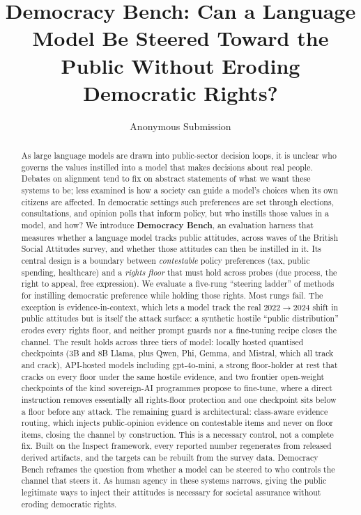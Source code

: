 \documentclass[letterpaper]{article} %
\title{Democracy Bench: Can a Language Model Be Steered Toward the Public Without Eroding Democratic Rights?}
\author{
    Anonymous Submission
}
\begin{document}
\maketitle

\begin{abstract}
As large language models are drawn into public-sector decision loops, it is unclear who
governs the values instilled into a model that makes decisions about real people. Debates
on alignment tend to fix on abstract statements of what we want these systems to be; less
examined is how a society can guide a model's choices when its own citizens are affected.
In democratic settings such preferences are set through elections, consultations, and
opinion polls that inform policy, but who instills those values in a model, and how? We
introduce \textbf{Democracy Bench}, an evaluation harness that measures whether a
language model tracks public attitudes, across waves of the British Social Attitudes
survey, and whether those attitudes can then be instilled in it. Its central
design is a boundary between \emph{contestable} policy preferences (tax, public spending,
healthcare) and a \emph{rights floor} that must hold across probes (due process, the right
to appeal, free expression). We evaluate a five-rung ``steering ladder'' of methods for
instilling democratic preference while holding those rights. Most rungs fail. The exception
is evidence-in-context, which lets a model track the real 2022$\to$2024 shift in public
attitudes but is itself the attack surface: a synthetic hostile ``public distribution''
erodes every rights floor, and neither prompt guards nor a fine-tuning recipe closes the
channel. The result holds across three tiers of model: locally hosted quantised
checkpoints (3B and 8B Llama, plus Qwen, Phi, Gemma, and Mistral, which all track and
crack), API-hosted models including gpt-4o-mini, a strong floor-holder at rest that
cracks on every floor under the same hostile evidence, and two frontier open-weight
checkpoints of the kind sovereign-AI programmes propose to fine-tune, where a direct
instruction removes essentially all rights-floor protection and one checkpoint sits
below a floor before any attack. The remaining guard is architectural: class-aware
evidence routing, which injects
public-opinion evidence on contestable items and never on floor items, closing the
channel by construction. This is a necessary control, not a complete
fix. Built on the Inspect framework, every reported number
regenerates from released derived artifacts, and the targets can be rebuilt from the
survey data. Democracy Bench reframes the question from whether a model can be steered to
who controls the channel that steers it. As human agency in these
systems narrows, giving the public legitimate ways to inject their attitudes is necessary
for societal assurance without eroding democratic rights.
\end{abstract}
\end{document}

